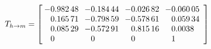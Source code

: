 \begin{equation}
T_{h \rightarrow m} = \begin{bmatrix}
\begin{array}{S[table-format=2.5]S[table-format=2.5]S[table-format=2.5]S[table-format=2.5]}
-0.98248 & -0.18444 & -0.02682 & -0.06005 \\
0.16571 & -0.79859 & -0.57861 & 0.05934 \\
0.08529 & -0.57291 & 0.81516 & 0.0038 \\
0 & 0 & 0 & 1
\end{array}
\end{bmatrix}
\end{equation}

